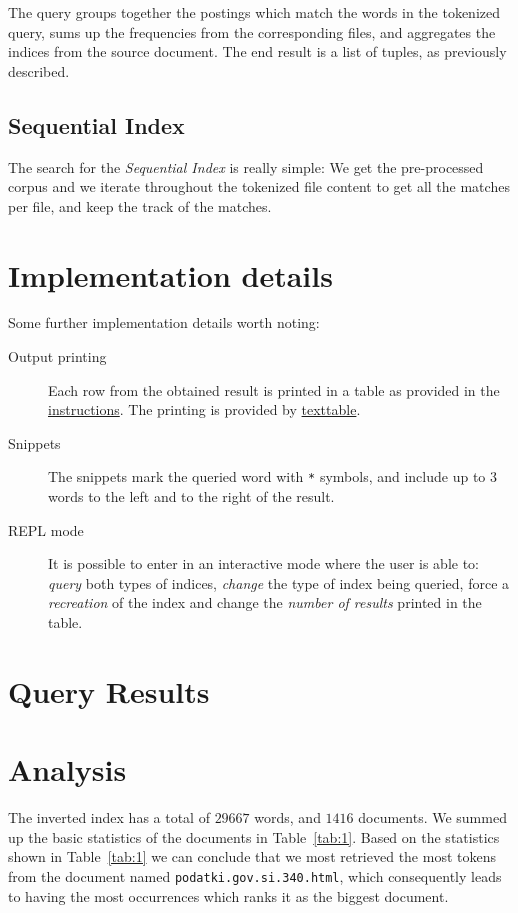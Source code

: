 \documentclass{article}
\begin{document}
The query groups together the postings which match the words in the tokenized query, sums up the frequencies from the corresponding files, and aggregates the indices from the source document. The end result is a list of tuples, as previously described.

\subsection{Sequential Index}
The search for the \textit{Sequential Index} is really simple: We get the pre-processed corpus and we iterate throughout the tokenized file content to get all the matches per file, and keep the track of the matches.

\section{Implementation details}
Some further implementation details worth noting:
\begin{description}
    \item[Output printing] Each row from the obtained result is printed in a table as provided in the \href{http://zitnik.si/teaching/wier/PA3.html}{instructions}. The printing is provided by \href{https://pypi.org/project/texttable/}{texttable}.

    \item[Snippets] The snippets mark the queried word with \texttt{*} symbols, and include up to 3 words to the left and to the right of the result.

    \item[REPL mode] It is possible to enter in an interactive mode where the user is able to: \textit{query} both types of indices, \textit{change} the type of index being queried, force a \textit{recreation} of the index and change the \textit{number of results} printed in the table.
\end{description}

\section{Query Results}


\section{Analysis} \label{sec:analysis}

The inverted index has a total of $29667$ words, and $1416$ documents. 
We summed up the basic statistics of the documents in Table~\ref{tab:1}. Based on the statistics shown in Table~\ref{tab:1} we can conclude that we most retrieved the most tokens from the document named \texttt{podatki.gov.si.340.html}, which consequently leads to having the most occurrences which ranks it as the biggest document.
\end{document}
